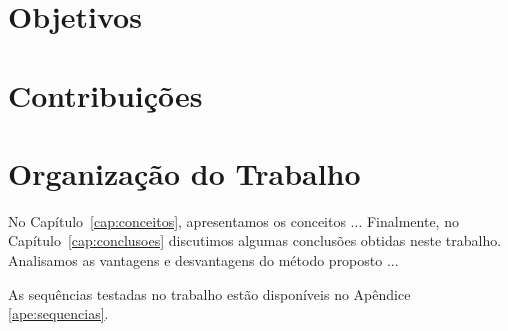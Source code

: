 

\section{Objetivos}
\label{sec:objetivo}



\section{Contribuições}
\label{sec:contribucoes}



\section{Organização do Trabalho}
\label{sec:organizacao_trabalho}

No Capítulo~\ref{cap:conceitos}, apresentamos os conceitos ... Finalmente, no
Capítulo~\ref{cap:conclusoes} discutimos algumas conclusões obtidas neste
trabalho. Analisamos as vantagens e desvantagens do método proposto ... 

As sequências testadas no trabalho estão disponíveis no Apêndice \ref{ape:sequencias}.
